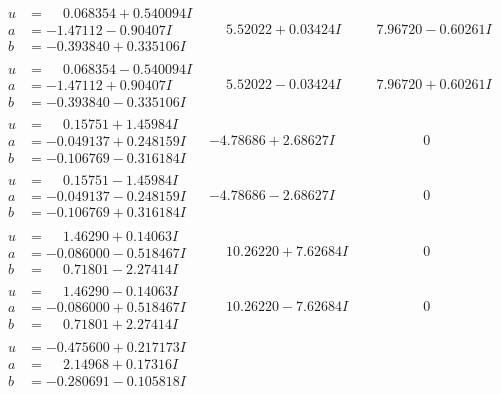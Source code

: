 \documentclass[1p]{elsarticle_modified}
\theoremstyle{definition}
\begin{document}
$$\begin{array}{c|c|c}
\begin{aligned}
u &= \phantom{-}0.068354 + 0.540094 I \\
a &= -1.47112 - 0.90407 I \\
b &= -0.393840 + 0.335106 I\end{aligned}
 & \phantom{-}5.52022 + 0.03424 I & \phantom{-}7.96720 - 0.60261 I \\ \hline\begin{aligned}
u &= \phantom{-}0.068354 - 0.540094 I \\
a &= -1.47112 + 0.90407 I \\
b &= -0.393840 - 0.335106 I\end{aligned}
 & \phantom{-}5.52022 - 0.03424 I & \phantom{-}7.96720 + 0.60261 I \\ \hline\begin{aligned}
u &= \phantom{-}0.15751 + 1.45984 I \\
a &= -0.049137 + 0.248159 I \\
b &= -0.106769 - 0.316184 I\end{aligned}
 & -4.78686 + 2.68627 I & \phantom{-0.000000 } 0 \\ \hline\begin{aligned}
u &= \phantom{-}0.15751 - 1.45984 I \\
a &= -0.049137 - 0.248159 I \\
b &= -0.106769 + 0.316184 I\end{aligned}
 & -4.78686 - 2.68627 I & \phantom{-0.000000 } 0 \\ \hline\begin{aligned}
u &= \phantom{-}1.46290 + 0.14063 I \\
a &= -0.086000 - 0.518467 I \\
b &= \phantom{-}0.71801 - 2.27414 I\end{aligned}
 & \phantom{-}10.26220 + 7.62684 I & \phantom{-0.000000 } 0 \\ \hline\begin{aligned}
u &= \phantom{-}1.46290 - 0.14063 I \\
a &= -0.086000 + 0.518467 I \\
b &= \phantom{-}0.71801 + 2.27414 I\end{aligned}
 & \phantom{-}10.26220 - 7.62684 I & \phantom{-0.000000 } 0 \\ \hline\begin{aligned}
u &= -0.475600 + 0.217173 I \\
a &= \phantom{-}2.14968 + 0.17316 I \\
b &= -0.280691 - 0.105818 I\end{aligned}

\end{array}$$
\end{document}

